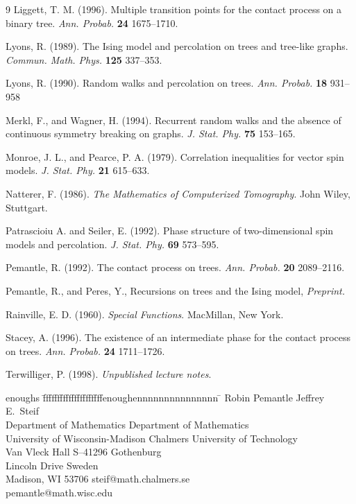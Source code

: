 \begin{thebibliography}{9}
 Liggett, T. M. (1996).
Multiple transition points for the contact
process on a binary tree.  {\em Ann. Probab.} {\bf 24} 1675--1710. 

 Lyons, R. (1989).
The Ising model and percolation on trees and tree-like graphs.
{\em Commun. Math. Phys.} {\bf 125} 337--353.

  Lyons, R. (1990).  Random walks and percolation
on trees. {\em Ann. Probab.} {\bf 18} 931--958

 Merkl, F., and Wagner, H. (1994).
Recurrent random walks and the absence of continuous symmetry breaking 
on graphs.  {\em J. Stat. Phy.} {\bf 75} 153--165.

 Monroe, J. L., and Pearce, P. A. (1979).
Correlation inequalities for vector spin models.
{\em J. Stat. Phy.} {\bf 21} 615--633.

 Natterer, F. (1986).  {\em The Mathematics of Computerized
Tomography}. John Wiley, Stuttgart.

 Patrascioiu A. and Seiler, E. (1992).
Phase structure of two-dimensional spin models and percolation.
{\em J. Stat. Phy.} {\bf 69} 573--595.

 Pemantle, R. (1992). The contact process on trees.
{\em Ann.  Probab.} {\bf 20} 2089--2116.

 Pemantle, R., and Peres, Y.,
Recursions on trees and the Ising model, {\em Preprint.}

 Rainville, E. D. (1960).  {\em Special Functions}.
MacMillan, New York.

  Stacey, A. (1996). The existence of an intermediate phase for 
the contact process on trees.  {\em Ann. Probab.} {\bf 24} 1711--1726.

 Terwilliger, P. (1998).  {\em Unpublished lecture notes}.

\end{thebibliography}

\noindent
\begin{tabbing}
enoughs \= fffffffffffffffffffffenoughennnnnnnnnnnnnnn \= \kill
\>  Robin Pemantle               \> Jeffrey E.~Steif \\
\>  Department of Mathematics         \> Department of Mathematics \\
\>  University of Wisconsin-Madison \> Chalmers University of Technology \\
\> Van Vleck Hall               \> S--41296 Gothenburg \\
 Lincoln Drive                \> Sweden \\
\>   Madison, WI 53706    \> steif@math.chalmers.se \\
\>  pemantle@math.wisc.edu             
\end{tabbing}



